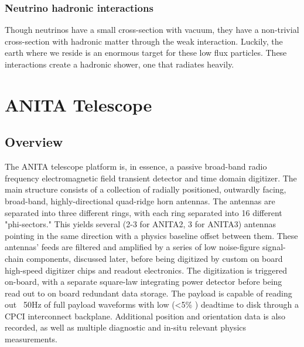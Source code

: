 	\subsection{Neutrino hadronic interactions}
		Though neutrinos have a small cross-section with vacuum, they have a non-trivial cross-section with hadronic matter through the weak interaction.  Luckily, the earth where we reside is an enormous target for these low flux particles.  These interactions create a hadronic shower, one that radiates heavily.


\chapter{ANITA Telescope}
\section{Overview}
	The ANITA telescope platform is, in essence, a passive broad-band radio frequency electromagnetic field transient detector and time domain digitizer.  The main structure consists of a collection of radially positioned, outwardly facing, broad-band, highly-directional quad-ridge horn antennas.  The antennas are separated into three different rings, with each ring separated into 16 different "phi-sectors."  This yields several (2-3 for ANITA2, 3 for ANITA3) antennas pointing in the same direction with a physics baseline offset between them. These antennas' feeds are filtered and amplified by a series of low noise-figure signal-chain components, discussed later, before being digitized by custom on board high-speed digitizer chips and readout electronics.  The digitization is triggered on-board, with a separate square-law integrating power detector before being read out to on board redundant data storage.  The payload is capable of reading out ~50Hz of full payload waveforms with low (\textless 5\% ) deadtime to disk through a CPCI interconnect backplane.  Additional position and orientation data is also recorded, as well as multiple diagnostic and in-situ relevant physics measurements.	
	
